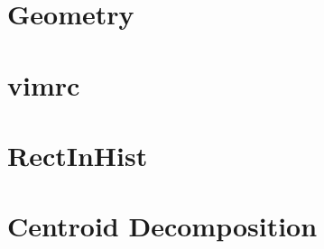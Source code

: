 \documentclass[twocolumn]{article}
\begin{document}
{    \section{Geometry}
    

    \newpage

    \section{vimrc}
    
    \section{RectInHist}
    

    \newpage

    \section{Centroid Decomposition}
    
}
\end{document}
